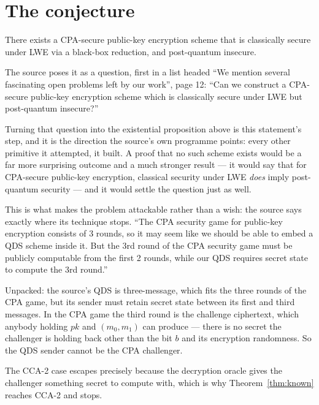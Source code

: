 \documentclass{aicr-conjecture}
\begin{document}
\section{The conjecture}\label{sec:conjectures}

\begin{conjecture}\label{conj:main}
There exists a CPA-secure public-key encryption scheme that is classically
secure under LWE via a black-box reduction, and post-quantum insecure.
\end{conjecture}

\begin{remark}\label{rem:framing}
The source poses it as a question, first in a list headed ``We mention
several fascinating open problems left by our work'', page 12: ``Can we
construct a CPA-secure public-key encryption scheme which is classically
secure under LWE but post-quantum insecure?''

Turning that question into the existential proposition above is this
statement's step, and it is the direction the source's own programme
points: every other primitive it attempted, it built. A proof that no
such scheme exists would be a far more surprising outcome and a much
stronger result --- it would say that for CPA-secure public-key
encryption, classical security under LWE \emph{does} imply post-quantum
security --- and it would settle the question just as well.
\end{remark}

\begin{remark}\label{rem:obstruction}
This is what makes the problem attackable rather than a wish: the source
says exactly where its technique stops. ``The CPA security game for
public-key encryption consists of 3 rounds, so it may seem like we should
be able to embed a QDS scheme inside it. But the 3rd round of the CPA
security game must be publicly computable from the first 2 rounds, while
our QDS requires secret state to compute the 3rd round.''

Unpacked: the source's QDS is three-message, which fits the three rounds
of the CPA game, but its sender must retain secret state between its
first and third messages. In the CPA game the third round is the
challenge ciphertext, which anybody holding $pk$ and $(m_0,m_1)$ can
produce --- there is no secret the challenger is holding back other than
the bit $b$ and its encryption randomness. So the QDS sender cannot be
the CPA challenger.

The CCA-2 case escapes precisely because the decryption oracle gives the
challenger something secret to compute with, which is why
Theorem~\ref{thm:known} reaches CCA-2 and stops.
\end{remark}
\end{document}
